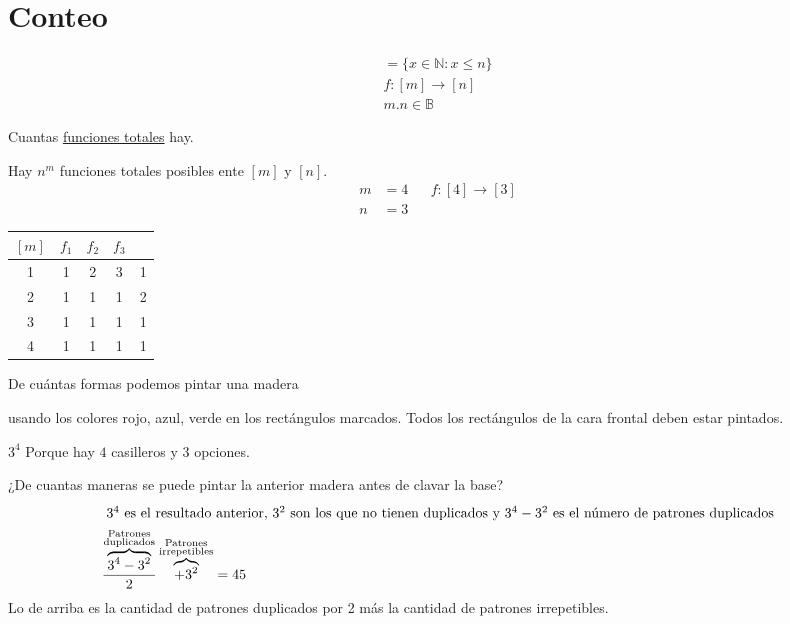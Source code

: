 \documentclass[../main.tex]{subfiles}
\begin{document}
\chapter{Conteo}%

\thispagestyle{fancy}

\begin{align*}
	[n] = \{x\in\mathbb{N}:x\leq n\}\\
	f:[m]\longrightarrow[n]\\
	m.n\in\mathbb{B}
\end{align*}

Cuantas \underline{funciones totales} hay.



Hay $n^m$ funciones totales posibles ente $[m]$ y $[n]$.
\begin{align*}
	m &=4 && f:[4]\longrightarrow[3]\\
	n &=3
\end{align*}

\begin{center}
	\begin{tabular}{c|c|c|c|c}
		$[m]$ & $f_1$ & $f_2$ & $f_3$ & \\
		\hline
		1 & 1 & 2 & 3 & 1\\
		2 & 1 & 1 & 1 & 2\\
		3 & 1 & 1 & 1 & 1\\
		4 & 1 & 1 & 1 & 1\\
	\end{tabular}
\end{center}

De cuántas formas podemos pintar una madera
usando los colores rojo, azul, verde en los rectángulos marcados.
Todos los rectángulos de la cara frontal deben estar pintados.

$3^4$
Porque hay $4$ casilleros y $3$ opciones.

¿De cuantas maneras se puede pintar la anterior madera antes de clavar la base?
\begin{align*}
	\intertext{ $3^4$ es el resultado anterior, $3^2$ son los que no
	tienen duplicados y $3^4-3^2$ es el número de patrones duplicados}
	\frac{\overbrace{3^4-3^2 }^{\substack{\text{Patrones}\\\text{duplicados}} }}{2}
	\overbrace{+3^2}^{\substack{\text{Patrones}\\\text{irrepetibles}} } = 45
\end{align*}
Lo de arriba es la cantidad de patrones duplicados por 2 más la cantidad de patrones
irrepetibles.
\end{document}
